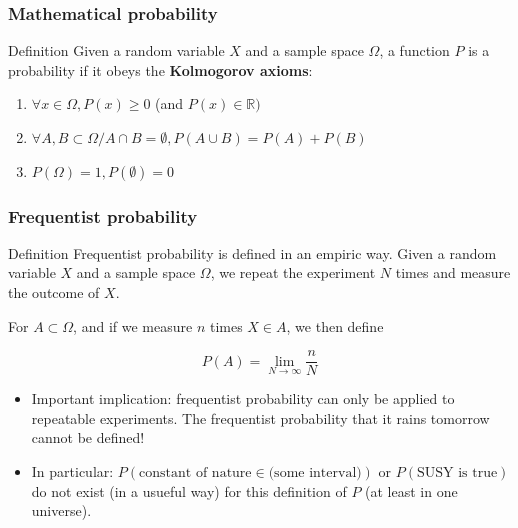 \documentclass[9pt]{beamer}
\begin{document}
\begin{frame}
 \frametitle{Mathematical probability}
 
 \begin{block}{Definition}
  Given a random variable $X$ and a sample space $\Omega$, a function $P$ is a probability if it obeys the \textbf{Kolmogorov axioms}:
  
  \begin{enumerate}
   \item<1-> $\forall x \in \Omega, P(x) \geq 0$ (and $P(x) \in \mathbb{R})$
   \item<2-> $\forall A, B \subset \Omega / A \cap B = \emptyset, P(A \cup B) = P(A) + P(B) $
   \item<3-> $P(\Omega) = 1, P(\emptyset)=0$ 
  \end{enumerate}

 \end{block}
 

\end{frame}

\begin{frame}
 \frametitle{Frequentist probability}
 
 \begin{block}{Definition}
 Frequentist probability is defined in an empiric way. Given a random variable $X$ and a sample space $\Omega$, we repeat the experiment $N$ times and measure the outcome of $X$.
 
 For $A \subset \Omega$, and if we measure $n$ times $X \in A$, we then define 
 
 $$P(A) = \lim_{N \to \infty} \frac{n}{N}$$
\end{block}

\begin{itemize}
 \item Important implication: frequentist probability can only be applied to repeatable experiments. The frequentist probability that it rains tomorrow cannot be defined!
 \item In particular: $P(\text{constant of nature} \in \text{(some interval)})$ or $P(\text{SUSY is true})$ \alert{do not exist} (in a usueful way) for this definition of $P$ (at least in one universe).
\end{itemize}

\end{frame}
\end{document}
